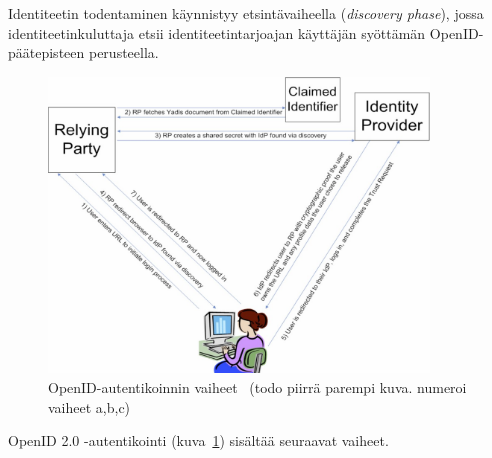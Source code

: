 \documentclass[finnish,gradu]{tktltiki}
\begin{document}
  Identiteetin todentaminen käynnistyy etsintävaiheella (\emph{discovery phase}), jossa identiteetinkuluttaja etsii identiteetintarjoajan käyttäjän syöttämän OpenID-päätepisteen perusteella.

  \begin{figure}
    \centering
    \includegraphics[width=0.9\textwidth]{images/openid_flow_recordon06.jpg}
    \caption[OpenID-autentikoinnin vaiheet]{OpenID-autentikoinnin vaiheet~\cite{openid_recordon_2009} (todo piirrä parempi kuva. numeroi vaiheet a,b,c)}
    \label{fig:basic_openid_flow}
  \end{figure}

  OpenID 2.0 -autentikointi (kuva~\ref{fig:basic_openid_flow}) sisältää seuraavat vaiheet.
\end{document}

